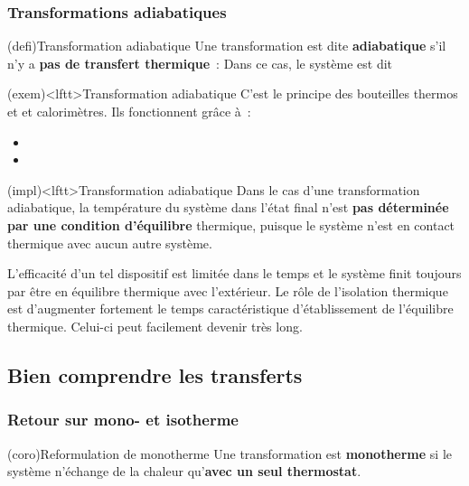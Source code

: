 \documentclass[../../main/main.tex]{subfiles}
\begin{document}
\subsubsection{Transformations adiabatiques}
\begin{tcb*}(defi){Transformation adiabatique}
	Une transformation est dite \textbf{adiabatique} s'il n'y a \textbf{pas
		de transfert thermique}~:
	\psw{%
		\[
			\boxed{Q = 0}
		\]
	}%
	Dans ce cas, le système est dit 
\end{tcb*}

\begin{tcb}(exem)<lftt>{Transformation adiabatique}
	C'est le principe des bouteilles thermos et et calorimètres. Ils fonctionnent
	grâce à~:
	\begin{itemize}
		\item {}
		\item {}
	\end{itemize}
\end{tcb}

\begin{tcb}(impl)<lftt>{Transformation adiabatique}
	Dans le cas d'une transformation adiabatique, la température du système dans
	l'état final n'est \textbf{pas déterminée par une condition d'équilibre}
	thermique, puisque le système n'est en contact thermique avec aucun autre
	système.
\end{tcb}

L'efficacité d'un tel dispositif est limitée dans le temps et le système finit
toujours par être en équilibre thermique avec l'extérieur. Le rôle de
l'isolation thermique est d'augmenter fortement le temps caractéristique
d'établissement de l'équilibre thermique. Celui-ci peut facilement devenir
très long.

\subsection{Bien comprendre les transferts}
\subsubsection{Retour sur mono- et isotherme}

\begin{tcb*}(coro){Reformulation de monotherme}
	Une transformation est \textbf{monotherme} si le système n'échange de la
	chaleur qu'\textbf{avec un seul thermostat}.
\end{tcb*}
\end{document}
